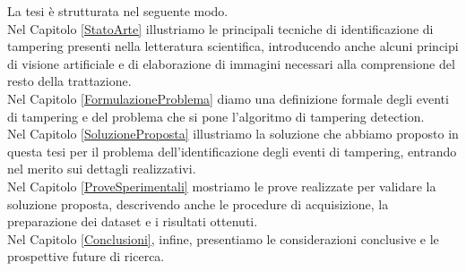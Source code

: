 \noindent La tesi \`e strutturata nel seguente modo.\\
Nel Capitolo \ref{StatoArte} illustriamo le principali tecniche di identificazione di tampering presenti nella letteratura scientifica, introducendo anche alcuni principi di visione artificiale e di elaborazione di immagini necessari alla comprensione del resto della trattazione.\\
Nel Capitolo \ref{FormulazioneProblema} diamo una definizione formale degli eventi di tampering e del problema che si pone l'algoritmo di tampering detection.\\
Nel Capitolo \ref{SoluzioneProposta} illustriamo la soluzione che abbiamo proposto in questa tesi per il problema dell'identificazione degli eventi di tampering, entrando nel merito sui dettagli realizzativi.\\
Nel Capitolo \ref{ProveSperimentali} mostriamo le prove realizzate per validare la soluzione proposta, descrivendo anche le procedure di acquisizione, la preparazione dei dataset e i risultati ottenuti.\\
Nel Capitolo \ref{Conclusioni}, infine, presentiamo le considerazioni conclusive e le prospettive future di ricerca.
	
